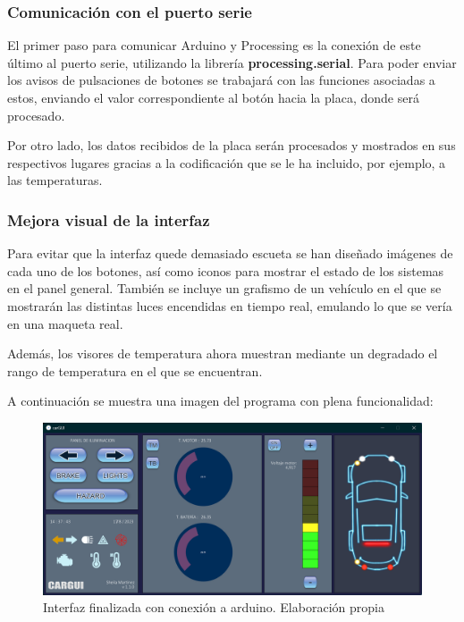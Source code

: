 \subsubsection{Comunicación con el puerto serie}

El primer paso para comunicar Arduino y Processing es la conexión de este último al puerto serie, utilizando la librería \textbf{processing.serial}. Para poder enviar los avisos de pulsaciones de botones se trabajará con las funciones asociadas a estos, enviando el valor correspondiente al botón hacia la placa, donde será procesado.

Por otro lado, los datos recibidos de la placa serán procesados y mostrados en sus respectivos lugares gracias a la codificación que se le ha incluido, por ejemplo, a las temperaturas. 

\subsubsection{Mejora visual de la interfaz}

Para evitar que la interfaz quede demasiado escueta se han diseñado imágenes de cada uno de los botones, así como iconos para mostrar el estado de los sistemas en el panel general. También se incluye un grafismo de un vehículo en el que se mostrarán las distintas luces encendidas en tiempo real, emulando lo que se vería en una maqueta real. 

Además, los visores de temperatura ahora muestran mediante un degradado el rango de temperatura en el que se encuentran.

A continuación se muestra una imagen del programa con plena funcionalidad:

\begin{figure}[H]
    \centering
    \includegraphics[width=1\textwidth]{imagenes/cargui_final.png}
    \caption{Interfaz finalizada con conexión a arduino. Elaboración propia}
\end{figure}



